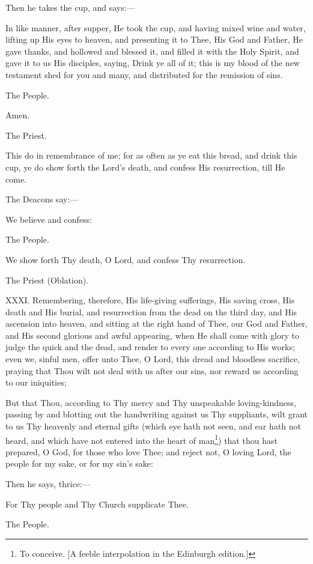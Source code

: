 Then he takes the cup, and says:—

In like manner, after supper, He took the cup, and having mixed wine and water, lifting up His eyes to heaven, and presenting it to Thee, His God and Father, He gave thanks, and hollowed and blessed it, and filled it with the Holy Spirit, and gave it to us His disciples, saying, Drink ye all of it; this is my blood of the new testament shed for you and many, and distributed for the remission of sins.

The People.

Amen.

The Priest.

This do in remembrance of me; for as often as ye eat this bread, and drink this cup, ye do show forth the Lord’s death, and confess His resurrection, till He come.

The Deacons say:—

We believe and confess:

The People.

We show forth Thy death, O Lord, and confess Thy resurrection.

The Priest (Oblation).

XXXI. Remembering, therefore, His life-giving sufferings, His saving cross, His death and His burial, and resurrection from the dead on the third day, and His ascension into heaven, and sitting at the right hand of Thee, our God and Father, and His second glorious and awful appearing, when He shall come with glory to judge the quick and the dead, and render to every one according to His works; even we, sinful men, offer unto Thee, O Lord, this dread and bloodless sacrifice, praying that Thou wilt not deal with us after our sins, nor reward us according to our iniquities;

But that Thou, according to Thy mercy and Thy unspeakable loving-kindness, passing by and blotting out the handwriting against us Thy suppliants, wilt grant to us Thy heavenly and eternal gifts (which eye hath not seen, and ear hath not heard, and which have not entered into the heart of man\footnote{\par  To conceive. [A feeble interpolation in the Edinburgh edition.]}) that thou hast prepared, O God, for those who love Thee; and reject not, O loving Lord, the people for my sake, or for my sin’s sake:

Then he says, thrice:—

For Thy people and Thy Church supplicate Thee.

The People.

